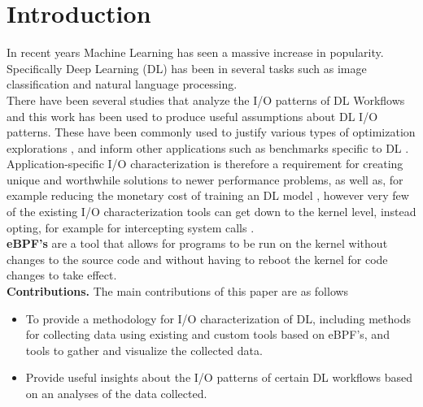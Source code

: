 \documentclass[conference]{IEEEtran}
\begin{document}
\section{Introduction}
In recent years Machine Learning has seen a massive increase in popularity.
Specifically Deep Learning (DL) has been in several tasks such as image classification
and natural language processing.\\
There have been several studies that analyze the I/O patterns of DL Workflows and this work
has been used to produce useful assumptions about DL I/O patterns. These have been commonly used to
justify various types of optimization explorations \cite{LMDB, nvme, beegfsDL, bamboo}, and inform 
other applications such as benchmarks specific to DL \cite{TFbenchmark}. \\
Application-specific I/O characterization is therefore a requirement for creating
unique and worthwhile solutions to
newer performance problems, as well as, for example reducing the monetary cost of training an 
DL model \cite{bamboo}, however very few of the existing I/O characterization tools
can get down to the kernel level, instead opting, for example for intercepting system calls \cite{HPCIODarshan}.\\
\textbf{eBPF's} are a tool that allows for programs to be run on the kernel without changes to
the source code and without having to reboot the kernel for code changes to take effect.\\
\textbf{Contributions.} The main contributions of this paper are as follows
\begin{itemize}
    \item To provide a methodology for I/O characterization of DL, including methods for collecting data using existing and custom tools based on eBPF's, and tools to gather and visualize the collected data.
    \item Provide useful insights about the I/O patterns of certain DL workflows based on an analyses of the data collected.
\end{itemize}
\end{document}
